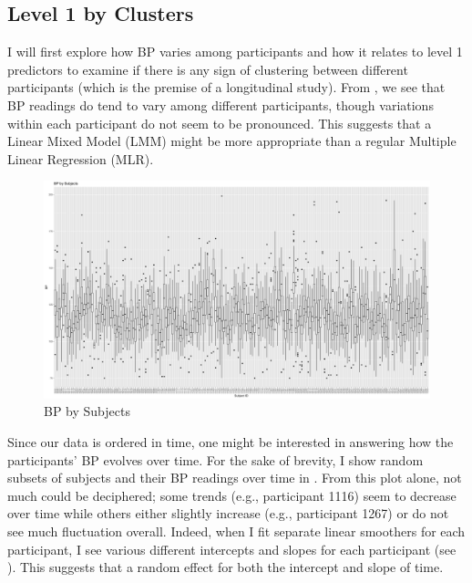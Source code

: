 \documentclass[12pt,twoside,letterpaper]{article}
\theoremstyle{definition}
\theoremstyle{definition}
\begin{document}
\subsection{Level 1 by Clusters}\label{sec: lv1}

I will first explore how BP varies among participants and how it relates to level 1 predictors to examine if there is any sign of clustering between different participants (which is the premise of a longitudinal study). From , we see that BP readings do tend to vary among different participants, though variations within each participant do not seem to be pronounced. This suggests that a Linear Mixed Model (LMM) might be more appropriate than a regular Multiple Linear Regression (MLR).

\begin{figure} 
    \centering
    \includegraphics[width=\textwidth]{pics/bp by subjects.png}
    \caption{BP by Subjects}
    \label{fig: bp by subjects}
    \end{figure}

Since our data is ordered in time, one might be interested in answering how the participants' BP evolves over time. For the sake of brevity, I show random subsets of subjects and their BP readings over time in . From this plot alone, not much could be deciphered; some trends (e.g., participant 1116) seem to decrease over time while others either slightly increase (e.g., participant 1267) or do not see much fluctuation overall. Indeed, when I fit separate linear smoothers for each participant, I see various different intercepts and slopes for each participant (see ). This suggests that a random effect for both the intercept and slope of time.
\end{document}
